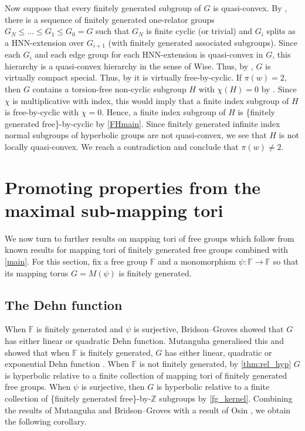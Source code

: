 \documentclass[11pt, a4paper]{amsart}
\theoremstyle{definition}
\newcommand{\F}{\mathbb{F}}
\newcommand{\Z}{\mathbb{Z}}
\begin{document}
Now suppose that every finitely generated subgroup of $G$ is quasi-convex. By \cite{Li25}, there is a sequence of finitely generated one-relator groups $G_N\leqslant \ldots\leqslant G_1\leqslant G_0 = G$ such that $G_N$ is finite cyclic (or trivial) and $G_i$ splits as a HNN-extension over $G_{i+1}$ (with finitely generated associated subgroups). Since each $G_i$ and each edge group for each HNN-extension is quasi-convex in $G$, this hierarchy is a quasi-convex hierarchy in the sense of Wise. Thus, by \cite{Wi21}, $G$ is virtually compact special. Thus, by \cite{KL24b} it is virtually free-by-cyclic. If $\pi(w) = 2$, then $G$ contains a torsion-free non-cyclic subgroup $H$ with $\chi(H) = 0$ by \cite{LW22}. Since $\chi$ is multiplicative with index, this would imply that a finite index subgroup of $H$ is free-by-cyclic with $\chi = 0$. Hence, a finite index subgroup of $H$ is \{finitely generated free\}-by-cyclic by \cref{FHmain}. Since finitely generated infinite index normal subgroups of hyperbolic groups are not quasi-convex, we see that $H$ is not locally quasi-convex. We reach a contradiction and conclude that $\pi(w)\neq 2$.





\section{Promoting properties from the maximal sub-mapping tori}
\label{sec:applications}

We now turn to further results on mapping tori of free groups which follow from known results for mapping tori of finitely generated free groups combined with \cref{main}. For this section, fix a free group $\F$ and a monomorphism $\psi\colon \F\to\F$ so that its mapping torus $G = M(\psi)$ is finitely generated. 


\subsection{The Dehn function}

When $\F$ is finitely generated and $\psi$ is surjective, Bridson--Groves \cite{BG10} showed that $G$ has either linear or quadratic Dehn function. Mutanguha generalised this and showed that when $\F$ is finitely generated, $G$ has either linear, quadratic or exponential Dehn function \cite[Corollary 4.8]{Mu24}. When $\F$ is not finitely generated, by \cref{thm:rel_hyp} $G$ is hyperbolic relative to a finite collection of mapping tori of finitely generated free groups. When $\psi$ is surjective, then $G$ is hyperbolic relative to a finite collection of \{finitely generated free\}-by-$\Z$ subgroups by \cref{fg_kernel}. Combining the results of Mutanguha and Bridson--Groves with a result of Osin \cite[Corollary 2.41]{Os06}, we obtain the following corollary.
\end{document}
